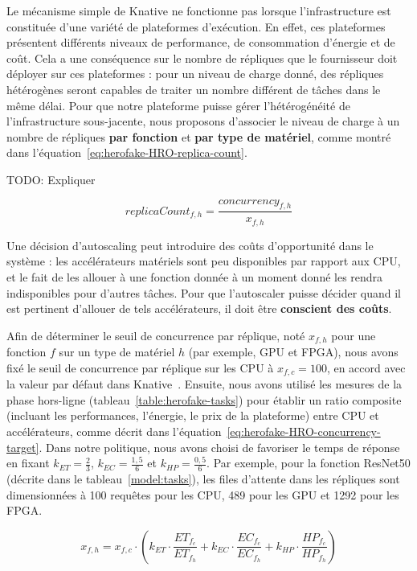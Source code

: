 Le mécanisme simple de Knative ne fonctionne pas lorsque l'infrastructure est constituée d'une variété de plateformes d'exécution. En effet, ces plateformes présentent différents niveaux de performance, de consommation d'énergie et de coût. Cela a une conséquence sur le nombre de répliques que le fournisseur doit déployer sur ces plateformes : pour un niveau de charge donné, des répliques hétérogènes seront capables de traiter un nombre différent de tâches dans le même délai. Pour que notre plateforme puisse gérer l'hétérogénéité de l'infrastructure sous-jacente, nous proposons d'associer le niveau de charge à un nombre de répliques \textbf{par fonction} et \textbf{par type de matériel}, comme montré dans l'équation~\ref{eq:herofake-HRO-replica-count}.

TODO: Expliquer

\begin{equation}
    replicaCount_{f, h} = \frac{concurrency_{f, h}}{x_{f, h}}
\label{eq:herofake-HRO-replica-count}
\end{equation}

Une décision d'autoscaling peut introduire des coûts d'opportunité dans le système : les accélérateurs matériels sont peu disponibles par rapport aux CPU, et le fait de les allouer à une fonction donnée à un moment donné les rendra indisponibles pour d'autres tâches. Pour que l'autoscaler puisse décider quand il est pertinent d'allouer de tels accélérateurs, il doit être \textbf{conscient des coûts}.

Afin de déterminer le seuil de concurrence par réplique, noté $x_{f, h}$ pour une fonction $f$ sur un type de matériel $h$ (par exemple, GPU et FPGA), nous avons fixé le seuil de concurrence par réplique sur les CPU à $x_{f, c} = 100$, en accord avec la valeur par défaut dans Knative~\cite{knative-concurrency}. Ensuite, nous avons utilisé les mesures de la phase hors-ligne (tableau~\ref{table:herofake-tasks}) pour établir un ratio composite (incluant les performances, l'énergie, le prix de la plateforme) entre CPU et accélérateurs, comme décrit dans l'équation~\ref{eq:herofake-HRO-concurrency-target}. Dans notre politique, nous avons choisi de favoriser le temps de réponse en fixant $k_{ET} = \frac{2}{3}$, $k_{EC} = \frac{1,5}{6}$ et $k_{HP} = \frac{0,5}{6}$. Par exemple, pour la fonction ResNet50 (décrite dans le tableau~\ref{model:tasks}), les files d'attente dans les répliques sont dimensionnées à 100 requêtes pour les CPU, 489 pour les GPU et 1292 pour les FPGA.

\begin{equation}
    x_{f, h} = x_{f, c} \cdot (k_{ET} \cdot \frac{ET_{{f}_{c}}}{ET_{{f}_{h}}} + k_{EC} \cdot \frac{EC_{{f}_{c}}}{EC_{{f}_{h}}} + k_{HP} \cdot \frac{HP_{{f}_{c}}}{HP_{{f}_{h}}})
\label{eq:herofake-HRO-concurrency-target}
\end{equation}

